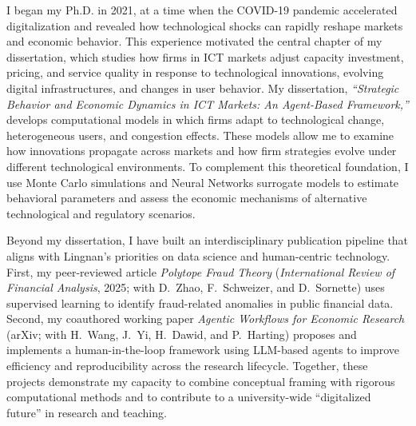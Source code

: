 \documentclass[11pt]{article}
\begin{document}
I began my Ph.D. in 2021, at a time when the COVID-19 pandemic accelerated digitalization and revealed how technological shocks can rapidly reshape markets and economic behavior. 
This experience motivated the central chapter of my dissertation, which studies how firms in ICT markets adjust capacity investment, pricing, and service quality in response to technological innovations, evolving digital infrastructures, and changes in user behavior. 
My dissertation, \textit{“Strategic Behavior and Economic Dynamics in ICT Markets: An Agent-Based Framework,”} develops computational models in which firms adapt to technological change, heterogeneous users, and congestion effects. 
These models allow me to examine how innovations propagate across markets and how firm strategies evolve under different technological environments. 
To complement this theoretical foundation, I use Monte Carlo simulations and Neural Networks surrogate models to estimate behavioral parameters and assess the economic mechanisms of alternative technological and regulatory scenarios. 

Beyond my dissertation, I have built an interdisciplinary publication pipeline that aligns with Lingnan’s priorities on data science and human-centric technology. First, my peer-reviewed article \emph{Polytope Fraud Theory} (\textit{International Review of Financial Analysis}, 2025; with D.\ Zhao, F.\ Schweizer, and D.\ Sornette) uses supervised learning to identify fraud-related anomalies in public financial data. Second, my coauthored working paper \emph{Agentic Workflows for Economic Research} (arXiv; with H.\ Wang, J.\ Yi, H.\ Dawid, and P.\ Harting) proposes and implements a human-in-the-loop framework using LLM-based agents to improve efficiency and reproducibility across the research lifecycle. Together, these projects demonstrate my capacity to combine conceptual framing with rigorous computational methods and to contribute to a university-wide “digitalized future” in research and teaching.
\end{document}
